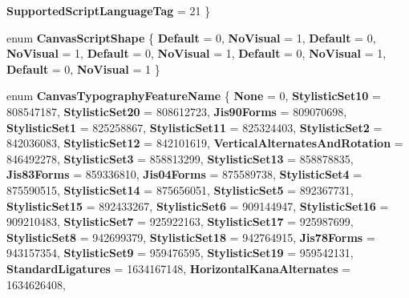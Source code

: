 \begin{DoxyCompactItemize}
{\bfseries Supported\+Script\+Language\+Tag} = 21
 \}
\item 
\mbox{\label{namespace_microsoft_1_1_graphics_1_1_canvas_1_1_text_a384b9463c1092502564c5ab676b2de09}} 
enum {\bfseries Canvas\+Script\+Shape} \{ \newline
{\bfseries Default} = 0, 
{\bfseries No\+Visual} = 1, 
{\bfseries Default} = 0, 
{\bfseries No\+Visual} = 1, 
\newline
{\bfseries Default} = 0, 
{\bfseries No\+Visual} = 1, 
{\bfseries Default} = 0, 
{\bfseries No\+Visual} = 1, 
\newline
{\bfseries Default} = 0, 
{\bfseries No\+Visual} = 1
 \}
\item 
\mbox{\label{namespace_microsoft_1_1_graphics_1_1_canvas_1_1_text_a0b3acf542d0a5a81f48cf181f63ab6d7}} 
enum {\bfseries Canvas\+Typography\+Feature\+Name} \{ \newline
{\bfseries None} = 0, 
{\bfseries Stylistic\+Set10} = 808547187, 
{\bfseries Stylistic\+Set20} = 808612723, 
{\bfseries Jis90\+Forms} = 809070698, 
\newline
{\bfseries Stylistic\+Set1} = 825258867, 
{\bfseries Stylistic\+Set11} = 825324403, 
{\bfseries Stylistic\+Set2} = 842036083, 
{\bfseries Stylistic\+Set12} = 842101619, 
\newline
{\bfseries Vertical\+Alternates\+And\+Rotation} = 846492278, 
{\bfseries Stylistic\+Set3} = 858813299, 
{\bfseries Stylistic\+Set13} = 858878835, 
{\bfseries Jis83\+Forms} = 859336810, 
\newline
{\bfseries Jis04\+Forms} = 875589738, 
{\bfseries Stylistic\+Set4} = 875590515, 
{\bfseries Stylistic\+Set14} = 875656051, 
{\bfseries Stylistic\+Set5} = 892367731, 
\newline
{\bfseries Stylistic\+Set15} = 892433267, 
{\bfseries Stylistic\+Set6} = 909144947, 
{\bfseries Stylistic\+Set16} = 909210483, 
{\bfseries Stylistic\+Set7} = 925922163, 
\newline
{\bfseries Stylistic\+Set17} = 925987699, 
{\bfseries Stylistic\+Set8} = 942699379, 
{\bfseries Stylistic\+Set18} = 942764915, 
{\bfseries Jis78\+Forms} = 943157354, 
\newline
{\bfseries Stylistic\+Set9} = 959476595, 
{\bfseries Stylistic\+Set19} = 959542131, 
{\bfseries Standard\+Ligatures} = 1634167148, 
{\bfseries Horizontal\+Kana\+Alternates} = 1634626408, 

\end{DoxyCompactItemize}
